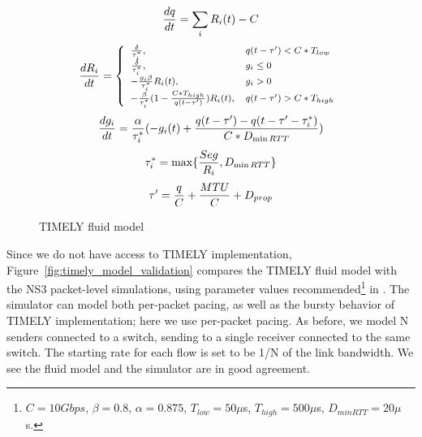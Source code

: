 \begin{figure}[h]
\fbox
{
\begin{minipage}{\columnwidth}
\begin{equation}
\small
\frac{{dq}}{{dt}} = \sum_{i} R_i(t) - C\\
\label{eq:timely_q}
\end{equation}
\begin{equation}
\small
\frac{{dR_i}}{{dt}} = \left\{ \begin{array}{ll}
\frac{\delta }{{\tau_i^*}}, & q(t - \tau ') < C*{T_{low}}\\
\frac{\delta }{{\tau_i^*}}, & g_i \le 0\\
 - \frac{{g_i\beta }}{{\tau_i^*}}R_i(t), & g_i > 0\\
 - \frac{\beta }{{\tau_i^*}}(1 - \frac{{C*{T_{high}}}}{{q(t - \tau ')}})R_i(t), & q(t - \tau ') > C*{T_{high}}
\end{array} \right.\\
\label{eq:timely_r}
\end{equation}
\begin{equation}
\small
\frac{{dg_i}}{{dt}} = \frac{\alpha }{{\tau_i^*}}( - g_i(t) + \frac{{q(t - \tau ') - q(t - \tau ' - \tau_i^*)}}{{C*{D_{\min RTT}}}})\\
\label{eq:timely_g}
\end{equation}
\begin{equation}
\small
\tau_i^* = \max \{ \frac{{Seg}}{R_i},{D_{\min RTT}}\} \\
\label{eq:timely_taus}
\end{equation}
\begin{equation}
\small
\tau ' = \frac{q}{C} + \frac{{MTU}}{C} + {D_{prop}}
\label{eq:timely_taup}
\end{equation}
\end{minipage}
}
\caption{TIMELY fluid model}
\vspace{-1em}
\label{fig:timely_model}
\end{figure}

Since we do not have access to TIMELY implementation,
Figure~\ref{fig:timely_model_validation} compares the TIMELY fluid model with
the NS3 packet-level simulations, using parameter values
recommended\footnote{$C=10Gbps$, $\beta=0.8$, $\alpha=0.875$, $T_{low} =
50\mu$s, $T_{high} = 500\mu$s, $D_{minRTT}= 20 \mu$s.} in \cite{timely}. The
simulator can model both per-packet pacing, as well as the bursty behavior of
TIMELY implementation; here we use per-packet pacing. As before, we model N
senders connected to a switch, sending to a single receiver connected to the
same switch.  The starting rate for each flow is set to be 1/N of the link
bandwidth. We see the fluid model and the simulator are in good agreement.

